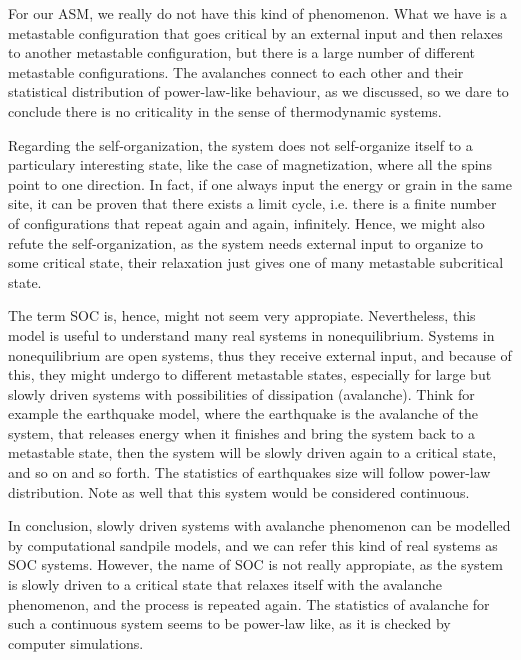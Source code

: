 For our ASM, we really do not have this kind of phenomenon.  
What we have is a metastable configuration that goes critical by an external input and then relaxes to another metastable configuration,
but there is a large number of different metastable configurations. The avalanches connect to each other and their statistical distribution of power-law-like behaviour, 
as we discussed, so we dare to conclude there is no criticality in the sense of thermodynamic systems. 

Regarding the self-organization, the system does not self-organize itself to a particulary interesting state, like the case of magnetization, where all the spins point to one direction.
In fact, if one always input the energy or grain in the same site, it can be proven that there exists a limit cycle, i.e. there is a finite number of configurations that repeat again and again, infinitely.
Hence, we might also refute the self-organization, as the system needs external input to organize to some critical state, their relaxation just gives one of many metastable subcritical state.

The term SOC is, hence, might not seem very appropiate. Nevertheless, this model is useful to understand many real systems in nonequilibrium.
Systems in nonequilibrium are open systems, thus they receive external input, and because of this, they might undergo to different metastable states, especially
for large but slowly driven systems with possibilities of dissipation (avalanche). 
Think for example the earthquake model, where the earthquake is the avalanche of the system, that releases energy when it finishes and bring the system back to a metastable state, 
then the system will be slowly driven again to a critical state, and so on and so forth. The statistics of earthquakes size will follow power-law distribution. 
Note as well that this system would be considered continuous.

In conclusion, slowly driven systems with avalanche phenomenon can be modelled by computational sandpile models, and we can refer this kind of real systems as SOC systems.
However, the name of SOC is not really appropiate, as the system is slowly driven to a critical state that relaxes itself with the avalanche phenomenon, and the process is repeated again.
The statistics of avalanche for such a continuous system seems to be power-law like, as it is checked by computer simulations. 



